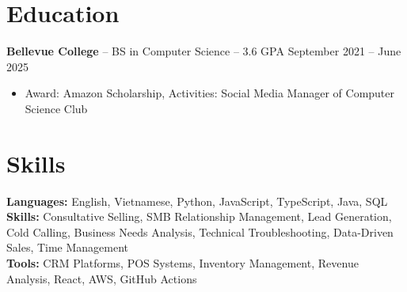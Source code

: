 \documentclass[11pt]{article}       %
\begin{document}
\vspace{-18.5pt}

\section*{Education}
\textbf{Bellevue College} -- BS in Computer Science -- 3.6 GPA \hfill September 2021 -- June 2025\\
\vspace{-9pt}
\begin{itemize}
  \item Award: Amazon Scholarship, Activities: Social Media Manager of Computer Science Club
\end{itemize}

\vspace{-18.5pt}

\section*{Skills}
\textbf{Languages:} English, Vietnamese, Python, JavaScript, TypeScript, Java, SQL\\
\textbf{Skills:} Consultative Selling, SMB Relationship Management, Lead Generation, Cold Calling, Business Needs Analysis, Technical Troubleshooting, Data-Driven Sales, Time Management\\
\textbf{Tools:} CRM Platforms, POS Systems, Inventory Management, Revenue Analysis, React, AWS, GitHub Actions\\

\vspace{-6.5pt}
\end{document}
